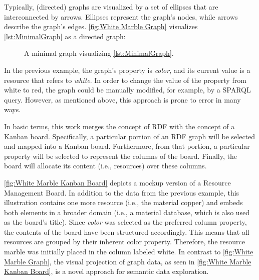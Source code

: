 \noindent Typically, (directed) graphs are visualized by a set of ellipses that are interconnected by arrows. Ellipses represent the graph’s nodes, while arrows describe the graph’s edges. \autoref{fig:White Marble Graph} visualizes \autoref{lst:MinimalGraph} as a directed graph:


\begin{figure}[ht]
    \libertineLF
    \centering
    
    \caption[Minimal Graph Visualization]{A minimal graph visualizing \autoref{lst:MinimalGraph}.}
    \label{fig:White Marble Graph}
    \libertineOsF
\end{figure}


\noindent In the previous example, the graph’s property is \textit{color}, and its current value is a resource that refers to \textit{white}. In order to change the value of the property from white to red, the graph could be manually modified, for example, by a \acrshort*{SPARQL} query. However, as mentioned above, this approach is prone to error in many ways.

\newpage

\noindent In basic terms, this work merges the concept of \acrshort*{RDF} with the concept of a Kanban board. Specifically, a particular portion of an \acrshort*{RDF} graph will be selected and mapped into a Kanban board. Furthermore, from that portion, a particular property will be selected to represent the columns of the board. Finally, the board will allocate its content (i.e., resources) over these columns.


\autoref{fig:White Marble Kanban Board} depicts a mockup version of a Resource Management Board. In addition to the data from the previous example, this illustration contains one more resource (i.e., the material copper) and embeds both elements in a broader domain (i.e., a material database, which is also used as the board’s title). Since \textit{color} was selected as the preferred column property, the contents of the board have been structured accordingly. This means that all resources are grouped by their inherent color property. Therefore, the resource marble was initially placed in the column labeled white. In contrast to \autoref{fig:White Marble Graph}, the visual projection of graph data, as seen in \autoref{fig:White Marble Kanban Board}, is a novel approach for semantic data exploration.


